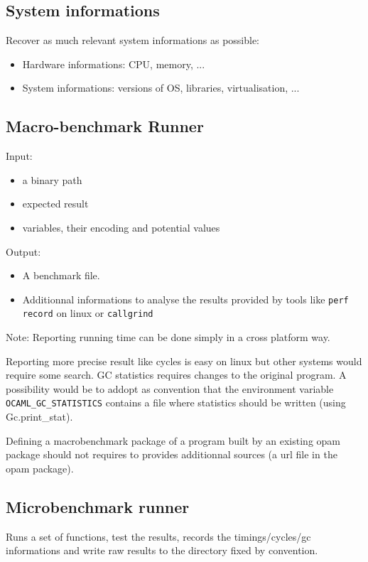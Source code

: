 \documentclass[11pt,a4paper]{article}
\begin{document}
\subsection{System informations}

Recover as much relevant system informations as possible:
\begin{itemize}
\item Hardware informations: CPU, memory, ...
\item System informations: versions of OS, libraries, virtualisation, ...
\end{itemize}

\subsection{Macro-benchmark Runner}

Input:
\begin{itemize}
\item a binary path
\item expected result
\item variables, their encoding and potential values
\end{itemize}

Output:
\begin{itemize}
\item A benchmark file.
\item Additionnal informations to analyse the results provided by
  tools like \texttt{perf record} on linux or \texttt{callgrind}
\end{itemize}

Note: Reporting running time can be done simply in a cross platform
way.

Reporting more precise result like cycles is easy on linux but
other systems would require some search. GC statistics requires
changes to the original program. A possibility would be to addopt as
convention that the environment variable
\texttt{OCAML\_GC\_STATISTICS} contains a file where statistics should
be written (using Gc.print\_stat).

Defining a macrobenchmark package of a program built by an existing
opam package should not requires to provides additionnal sources (a
url file in the opam package).

\subsection{Microbenchmark runner}

Runs a set of functions, test the results, records the
timings/cycles/gc informations and write raw results to the directory
fixed by convention.
\end{document}
